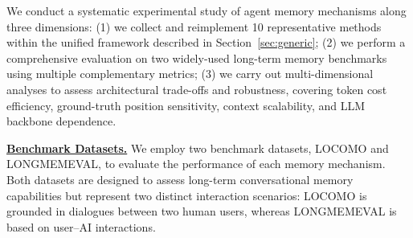 We conduct a systematic experimental study of agent memory mechanisms along three dimensions:
(1) we collect and reimplement 10 representative methods within the unified framework described in Section~\ref{sec:generic};
(2) we perform a comprehensive evaluation on two widely-used long-term memory benchmarks using multiple complementary metrics;
(3) we carry out multi-dimensional analyses to assess architectural trade-offs and robustness, covering token cost efficiency, ground-truth position sensitivity, context scalability, and LLM backbone dependence.


\noindent {} \textbf{\underline{Benchmark Datasets.}} 
We employ two benchmark datasets, LOCOMO and LONGMEMEVAL, to evaluate the performance of each memory mechanism. Both datasets are designed to assess long-term conversational memory capabilities but represent two distinct interaction scenarios: LOCOMO is grounded in dialogues between two human users, whereas LONGMEMEVAL is based on user--AI interactions.


